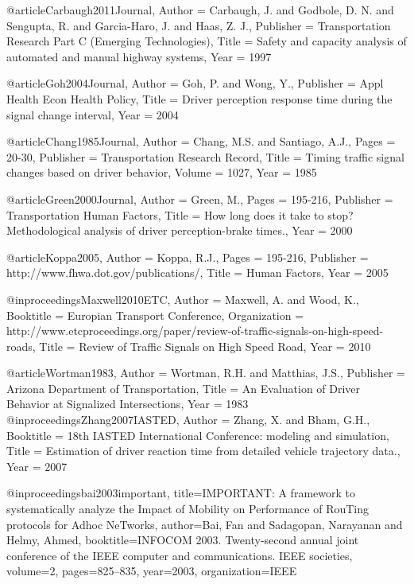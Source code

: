 {{{{@article{Carbaugh2011Journal,
	Author = {Carbaugh, J. and Godbole,  D. N. and Sengupta, R. and Garcia-Haro, J. and Haas, Z. J.},
	Publisher = {Transportation Research Part C (Emerging Technologies)},
	Title = {Safety and capacity analysis of automated and manual highway systems},
	Year = {1997}}

@article{Goh2004Journal,
	Author = {Goh, P. and Wong, Y.},
	Publisher = {Appl Health Econ Health Policy},
	Title = {Driver perception response time during the signal change interval},
	Year = {2004}}

@article{Chang1985Journal,
	Author = {Chang, M.S. and Santiago, A.J.},
	Pages = {20-30},
	Publisher = {Transportation Research Record},
	Title = {Timing traffic signal changes based on driver behavior},
	Volume = {1027},
	Year = {1985}}

@article{Green2000Journal,
	Author = {Green, M.},
	Pages = {195-216},
	Publisher = {Transportation Human Factors},
	Title = {How long does it take to stop? Methodological analysis of driver perception-brake times.},
	Year = {2000}}

@article{Koppa2005,
	Author = {Koppa, R.J.},
	Pages = {195-216},
	Publisher = {http://www.fhwa.dot.gov/publications/},
	Title = {Human Factors},
	Year = {2005}}

@inproceedings{Maxwell2010ETC,
	Author = {Maxwell, A. and Wood, K.},
	Booktitle = {Europian Transport Conference},
	Organization = {http://www.etcproceedings.org/paper/review-of-traffic-signals-on-high-speed-roads},
	Title = {Review of Traffic Signals on High Speed Road},
	Year = {2010}}

@article{Wortman1983,
	Author = {Wortman, R.H. and Matthias, J.S.},
	Publisher = {Arizona Department of Transportation},
	Title = {An Evaluation of Driver Behavior at Signalized Intersections},
	Year = {1983}}
@inproceedings{Zhang2007IASTED,
	Author = {Zhang, X. and Bham, G.H.},
	Booktitle = {18th IASTED International Conference: modeling and simulation},
	Title = {Estimation of driver reaction time from detailed vehicle trajectory data.},
	Year = {2007}}


@inproceedings{bai2003important,
	title={IMPORTANT: A framework to systematically analyze the Impact of Mobility on Performance of RouTing protocols for Adhoc NeTworks},
	author={Bai, Fan and Sadagopan, Narayanan and Helmy, Ahmed},
	booktitle={INFOCOM 2003. Twenty-second annual joint conference of the IEEE computer and communications. IEEE societies},
	volume={2},
	pages={825--835},
	year={2003},
	organization={IEEE}
}


}}}}
